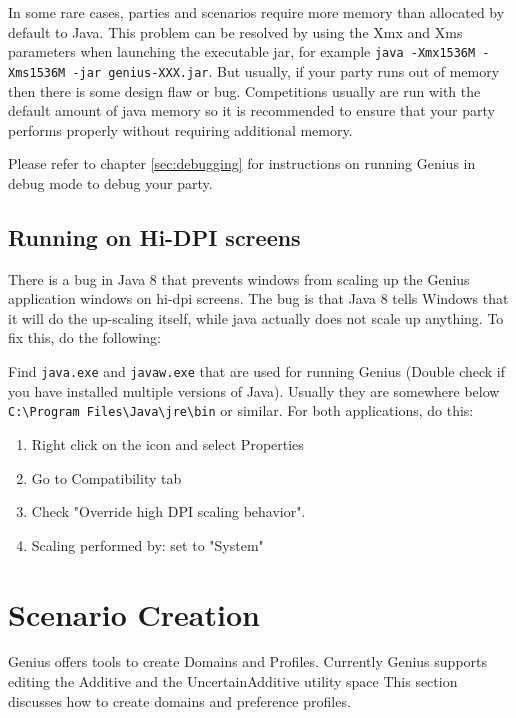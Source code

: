 \documentclass[]{article}
\newcommand\Genius{{\sc Genius}}
\begin{document}
In some rare cases, parties and scenarios require more memory than allocated by default to Java. This problem can be resolved by using the Xmx and Xms parameters when launching the executable jar, for example \texttt{java -Xmx1536M -Xms1536M -jar genius-XXX.jar}. But usually, if your party runs out of memory then there is some design flaw or bug. Competitions usually are run with the default amount of java memory so it is recommended to ensure that your  party performs properly without requiring additional memory.

Please refer to chapter \ref{sec:debugging} for instructions on running {\Genius} in debug mode to debug your party.

\subsection{Running on Hi-DPI screens}
There is a bug in Java 8 that prevents windows from scaling up the {\Genius} application windows on hi-dpi screens. The bug is that Java 8 tells Windows that it will do the up-scaling itself, while java actually does not scale up anything. To fix this, do the following:

Find \verb|java.exe| and \verb|javaw.exe| that are used for running {\Genius} (Double check if you have installed multiple versions of Java). Usually they are somewhere below \verb|C:\Program Files\Java\jre\bin| or similar. For both applications, do this:

\begin{enumerate}

\item  Right click on the icon and select Properties
\item    Go to Compatibility tab
\item    Check "Override high DPI scaling behavior".
\item    Scaling performed by: set to "System" 
\end{enumerate}

\section{Scenario Creation}\label{sec:scenariocreation}
{\Genius} offers tools to create Domains and Profiles. Currently {\Genius} supports editing the Additive and the UncertainAdditive utility space
 This section discusses how to create domains and preference profiles.
\end{document}
